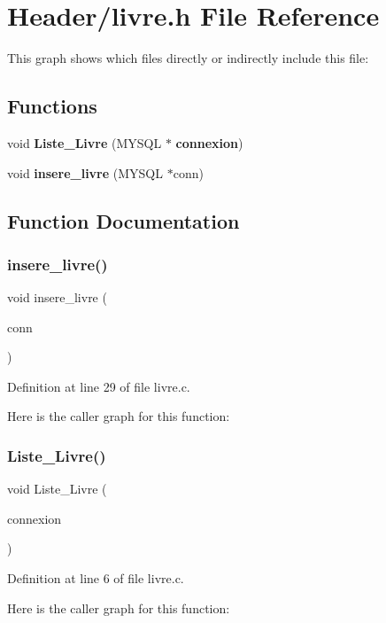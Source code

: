 \section{Header/livre.h File Reference}
\label{livre_8h}
This graph shows which files directly or indirectly include this file\+:
\subsection*{Functions}
\begin{DoxyCompactItemize}
\item 
void \textbf{ Liste\+\_\+\+Livre} (M\+Y\+S\+QL $\ast$\textbf{ connexion})
\item 
void \textbf{ insere\+\_\+livre} (M\+Y\+S\+QL $\ast$conn)
\end{DoxyCompactItemize}


\subsection{Function Documentation}
\mbox{\label{livre_8h_a3d5a407c94272ee4bf36d166a6e90133}} 
\subsubsection{insere\+\_\+livre()}
{\footnotesize\ttfamily void insere\+\_\+livre (\begin{DoxyParamCaption}\item[{M\+Y\+S\+QL $\ast$}]{conn }\end{DoxyParamCaption})}



Definition at line 29 of file livre.\+c.

Here is the caller graph for this function\+:
\mbox{\label{livre_8h_a6bc2464abd5d1b31cc86194922200113}} 
\subsubsection{Liste\+\_\+\+Livre()}
{\footnotesize\ttfamily void Liste\+\_\+\+Livre (\begin{DoxyParamCaption}\item[{M\+Y\+S\+QL $\ast$}]{connexion }\end{DoxyParamCaption})}



Definition at line 6 of file livre.\+c.

Here is the caller graph for this function\+:
